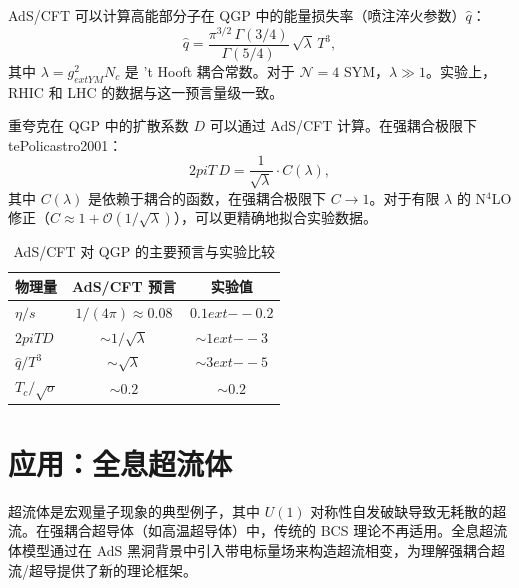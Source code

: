\begin{example}[喷注淬火参数]\label{ex:jet-quenching}
AdS/CFT 可以计算高能部分子在 QGP 中的能量损失率（喷注淬火参数）$\hat{q}$：
\begin{equation}
    \hat{q} = \frac{\pi^{3/2}\,\Gamma(3/4)}{\Gamma(5/4)}\,\sqrt{\lambda}\,T^3,
\end{equation}
其中 $\lambda = g_{ext{YM}}^2 N_c$ 是 't Hooft 耦合常数。对于 $\mathcal{N}=4$ SYM，$\lambda \gg 1$。实验上，RHIC 和 LHC 的数据与这一预言量级一致。
\end{example}

\begin{example}[重夸克扩散系数]\label{ex:heavy-quark-D}
重夸克在 QGP 中的扩散系数 $D$ 可以通过 AdS/CFT 计算。在强耦合极限下 	te{Policastro2001}：
\begin{equation}
    2pi T\,D = \frac{1}{\sqrt{\lambda}}\cdot C(\lambda),
\end{equation}
其中 $C(\lambda)$ 是依赖于耦合的函数，在强耦合极限下 $C \to 1$。对于有限 $\lambda$ 的 N$^4$LO 修正（$C \approx 1 + \mathcal{O}(1/\sqrt{\lambda})$），可以更精确地拟合实验数据。
\end{example}

\begin{table}[htbp]
\centering
\caption{AdS/CFT 对 QGP 的主要预言与实验比较}
\label{tab:QGP-predictions}
\begin{tabular}{lcc}
\hline
\textbf{物理量} & \textbf{AdS/CFT 预言} & \textbf{实验值} \\
\hline
$\eta/s$ & $1/(4\pi) \approx 0.08$ & $0.1ext{--}0.2$ \\
$2pi T D$ & $\sim 1/\sqrt{\lambda}$ & $\sim 1ext{--}3$ \\
$\hat{q}/T^3$ & $\sim \sqrt{\lambda}$ & $\sim 3ext{--}5$ \\
$T_c/\sqrt{\sigma}$ & $\sim 0.2$ & $\sim 0.2$ \\
\hline
\end{tabular}
\end{table}


\section{应用：全息超流体}

\begin{note}[物理动机]
超流体是宏观量子现象的典型例子，其中 $U(1)$ 对称性自发破缺导致无耗散的超流。在强耦合超导体（如高温超导体）中，传统的 BCS 理论不再适用。全息超流体模型通过在 AdS 黑洞背景中引入带电标量场来构造超流相变，为理解强耦合超流/超导提供了新的理论框架。
\end{note}


